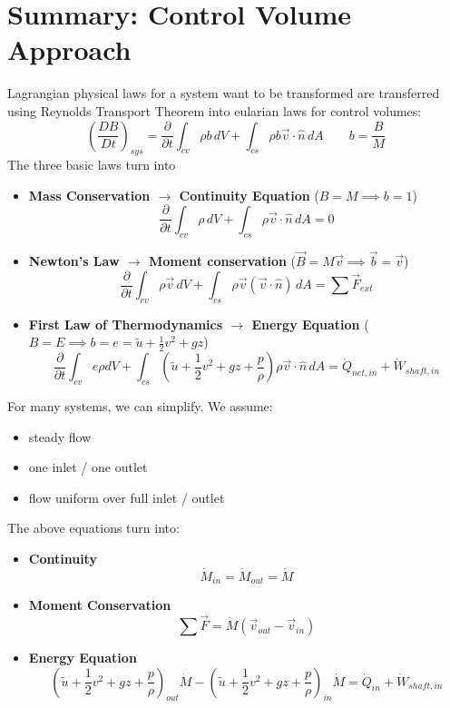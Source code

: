 \section{Summary: Control Volume Approach}
Lagrangian physical laws for a system want to be transformed are transferred using Reynolds Transport Theorem into eularian laws for control volumes:
\begin{equation*}
	\left(\frac{DB}{Dt}\right)_{sys} = \frac{\partial}{\partial t} \int_{cv}\rho b\,dV + \int_{cs} \rho b \vec v \cdot \hat n \,dA\qquad b = \frac BM
\end{equation*}
The three basic laws turn into
\begin{itemize}
	\setlength{\itemsep}{-5pt}
	\item \textbf{Mass Conservation $\rightarrow$ Continuity Equation} ($B=M\implies b=1$)
	\begin{equation*}
		\frac{\partial}{\partial t}\int_{cv}\rho\,dV + \int_{cs}\rho \vec v \cdot \hat n \,dA  = 0
	\end{equation*}
	\item \textbf{Newton's  Law $\rightarrow$ Moment conservation} ($\vec B = M\vec v \implies \vec b = \vec v$)
	\begin{equation*}
		\frac{\partial}{\partial t}\int_{cv} \rho\vec v \,dV+\int_{cs} \rho\vec v(\vec v\cdot \hat n)\,dA = \sum \vec F_{ext}
	\end{equation*}
	\item \textbf{First Law of Thermodynamics $\rightarrow$ Energy Equation} ($B=E\implies b = e = \tilde u + \frac 12 v^2 + g z$)
	\begin{equation*}
		\frac{\partial}{\partial t}\int_{cv} e\rho dV + \int_{cs} \left(\tilde u + \frac 12 v^2 + gz + \frac{p}{\rho}\right)\rho \vec v \cdot \hat n\,dA = \dot Q_{net,in}+ \dot W_{shaft,in}
	\end{equation*}
\end{itemize}
For many systems, we can simplify. We assume:
\begin{itemize}
	\setlength{\itemsep}{-5pt}
	\item steady flow
	\item one inlet / one outlet
	\item flow uniform over full inlet / outlet
\end{itemize}
The above equations turn into:
\begin{itemize}
	\setlength{\itemsep}{-5pt}
	\item \textbf{Continuity}
	\begin{equation*}
		\dot M_{in} = \dot M_{out} = \dot M
	\end{equation*}
	\item \textbf{Moment Conservation}
	\begin{equation*}
		\sum \vec F =\dot M\left(\vec v_{out}-\vec v_{in}\right)
	\end{equation*}
	\item \textbf{Energy Equation}
	\begin{equation*}
		\left(\tilde u + \frac 12 v^2 + gz + \frac p\rho\right)_{out} \dot M - \left(\tilde u + \frac 12 v^2 + gz + \frac p\rho\right)_{in} \dot M =\dot Q_{in} + \dot W_{shaft,in}
	\end{equation*}
\end{itemize}